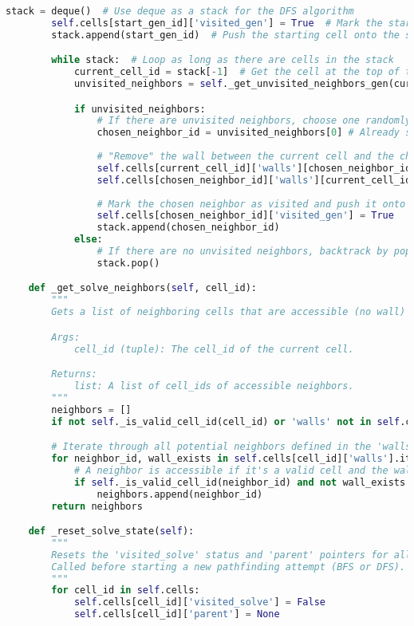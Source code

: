 \documentclass[UTF8]{report}
\theoremstyle{MyLineTheoremStyle} %
\theoremstyle{MyBlockTheoremStyle} %
\theoremstyle{MySubsubsectionStyle} %
\begin{document}
\begin{lstlisting}[language=Python, caption={迷宫生成与求解程序代码}]
        stack = deque()  # Use deque as a stack for the DFS algorithm
        self.cells[start_gen_id]['visited_gen'] = True  # Mark the starting cell as visited
        stack.append(start_gen_id)  # Push the starting cell onto the stack

        while stack:  # Loop as long as there are cells in the stack
            current_cell_id = stack[-1]  # Get the cell at the top of the stack (peek)
            unvisited_neighbors = self._get_unvisited_neighbors_gen(current_cell_id)

            if unvisited_neighbors:
                # If there are unvisited neighbors, choose one randomly
                chosen_neighbor_id = unvisited_neighbors[0] # Already shuffled, so pick the first
                
                # "Remove" the wall between the current cell and the chosen neighbor
                self.cells[current_cell_id]['walls'][chosen_neighbor_id] = False
                self.cells[chosen_neighbor_id]['walls'][current_cell_id] = False
                
                # Mark the chosen neighbor as visited and push it onto the stack
                self.cells[chosen_neighbor_id]['visited_gen'] = True
                stack.append(chosen_neighbor_id)
            else:
                # If there are no unvisited neighbors, backtrack by popping the current cell from the stack
                stack.pop()

    def _get_solve_neighbors(self, cell_id):
        """
        Gets a list of neighboring cells that are accessible (no wall) for path solving.

        Args:
            cell_id (tuple): The cell_id of the current cell.

        Returns:
            list: A list of cell_ids of accessible neighbors.
        """
        neighbors = []
        if not self._is_valid_cell_id(cell_id) or 'walls' not in self.cells[cell_id]: return neighbors

        # Iterate through all potential neighbors defined in the 'walls' dictionary
        for neighbor_id, wall_exists in self.cells[cell_id]['walls'].items():
            # A neighbor is accessible if it's a valid cell and the wall_exists is False (meaning no wall)
            if self._is_valid_cell_id(neighbor_id) and not wall_exists: 
                neighbors.append(neighbor_id)
        return neighbors

    def _reset_solve_state(self):
        """
        Resets the 'visited_solve' status and 'parent' pointers for all cells.
        Called before starting a new pathfinding attempt (BFS or DFS).
        """
        for cell_id in self.cells:
            self.cells[cell_id]['visited_solve'] = False
            self.cells[cell_id]['parent'] = None
    

\end{lstlisting}
\end{document}
